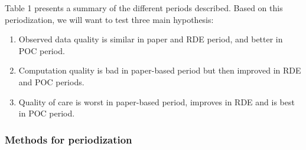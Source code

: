 \documentclass[a4paper,11pt,final,twoside]{article}
\begin{document}
Table 1 presents a summary of the different periods described. Based on this periodization, we will want to test three main hypothesis:
\begin{enumerate}
\item	Observed data quality is similar in paper and RDE period, and better in POC period.
\item	Computation quality is bad in paper-based period but then improved in RDE and POC periods.
\item	Quality of care is worst in paper-based period, improves in RDE and is best in POC period.
\end{enumerate}




        \subsubsection{Methods for periodization}
\end{document}
